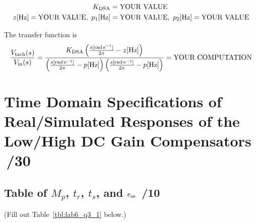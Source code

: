 \documentclass{article}
\newcommand{\score}{\hfill \underline{\hspace{0.65cm}}\,/} %
\begin{document}
\begin{align*}
   K_{\rm DSA} & =\mbox{\rm {YOUR VALUE}} \\ 
z_{\rm} \mbox{[\si{\hertz}]} = \mbox{\rm YOUR VALUE},~p_{1\rm} \mbox{[\si{\hertz}]} & =\mbox{\rm YOUR VALUE},~p_{2\rm} \mbox{[\si{\hertz}]} =\mbox{\rm YOUR VALUE}
\end{align*}

\noindent The transfer function is
\begin{align*}
\frac{V_{\rm tach}(s)}{V_{\rm in}(s)} = 
\frac{K_{\rm DSA}\left( \frac{s[\si{\radian\per\second}]}{2\pi}-z[\si{\hertz}] \right)}{\left(\frac{s[\si{\radian\per\second}]}{2\pi}-p[\si{\hertz}]\right)\left(\frac{s[\si{\radian\per\second}]}{2\pi}-p[\si{\hertz}]\right)} = \mbox{YOUR COMPUTATION}
\end{align*}

\begin{center}
\end{center}

\section{Time Domain Specifications of Real/Simulated Responses of the Low/High DC Gain Compensators \score 30}
\subsection{Table of $M_p$, $t_r$, $t_s$, and $e_{\rm ss}$ \score 10}
(Fill out Table~\ref{tbl:lab6_q3_1} below.)
\end{document}

